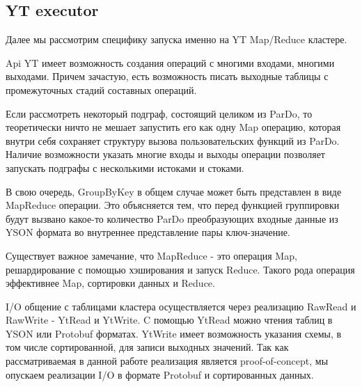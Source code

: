 \subsection{YT executor}

Далее мы рассмотрим специфику запуска именно на YT Map/Reduce кластере.

Api YT имеет возможность создания операций с многими входами, многими выходами. Причем зачастую, есть возможность писать выходные таблицы с промежуточных стадий составных операций.

Если рассмотреть некоторый подграф, состоящий целиком из ParDo, то теоретически ничто не мешает запустить его как одну Map операцию, которая внутри себя сохраняет структуру вызова пользовательских функций из ParDo. Наличие возможности указать многие входы и выходы операции позволяет запускать подграфы с несколькими истоками и стоками.

В свою очередь, GroupByKey в общем случае может быть представлен в виде MapReduce операции. Это объясняется тем, что перед функцией группировки будут вызвано какое-то количество ParDo преобразующих входные данные из YSON \cite{yson} формата во внутреннее представление пары ключ-значение.

Существует важное замечание, что MapReduce - это операция Map, решардирование с помощью хэширования и запуск Reduce. Такого рода операция эффективнее Map, сортировки данных и Reduce.

I/O общение с таблицами кластера осуществляется через реализацию RawRead и RawWrite - YtRead и YtWrite. C помощью YtRead можно чтения таблиц в YSON или Protobuf \cite{protobuf} форматах. YtWrite имеет возможность указания схемы, в том числе сортированной, для записи выходных значений. Так как рассматриваемая в данной работе реализация является proof-of-concept, мы опускаем реализации I/O в формате Protobuf и сортированных данных.
